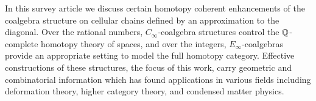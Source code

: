 
In this survey article we discuss certain homotopy coherent enhancements of the coalgebra structure on cellular chains defined by an approximation to the diagonal.
Over the rational numbers, $C_\infty$-coalgebra structures control the $\mathbb{Q}$-complete homotopy theory of spaces, and over the integers, $E_\infty$-coalgebras provide an appropriate setting to model the full homotopy category.
Effective constructions of these structures, the focus of this work, carry geometric and combinatorial information which has found applications in various fields including deformation theory, higher category theory, and condensed matter physics.